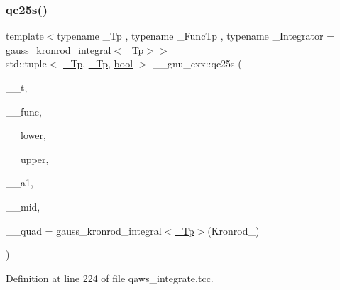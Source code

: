 \subsubsection{\texorpdfstring{qc25s()}{qc25s()}}
{\footnotesize\ttfamily template$<$typename \+\_\+\+Tp , typename \+\_\+\+Func\+Tp , typename \+\_\+\+Integrator  = gauss\+\_\+kronrod\+\_\+integral$<$\+\_\+\+Tp$>$$>$ \\
std\+::tuple$<$ \hyperlink{namespace____gnu__cxx_a3b19a9c800ca194374ef9172290f7d79}{\+\_\+\+Tp}, \hyperlink{namespace____gnu__cxx_a3b19a9c800ca194374ef9172290f7d79}{\+\_\+\+Tp}, \hyperlink{namespace____gnu__cxx_ae83aca57f97767d5d09188718728a0ac}{bool} $>$ \+\_\+\+\_\+gnu\+\_\+cxx\+::qc25s (\begin{DoxyParamCaption}\item[{\hyperlink{struct____gnu__cxx_1_1qaws__integration__table}{qaws\+\_\+integration\+\_\+table}$<$ \hyperlink{namespace____gnu__cxx_a3b19a9c800ca194374ef9172290f7d79}{\+\_\+\+Tp} $>$ \&}]{\+\_\+\+\_\+t,  }\item[{\+\_\+\+Func\+Tp}]{\+\_\+\+\_\+func,  }\item[{\hyperlink{namespace____gnu__cxx_a3b19a9c800ca194374ef9172290f7d79}{\+\_\+\+Tp}}]{\+\_\+\+\_\+lower,  }\item[{\hyperlink{namespace____gnu__cxx_a3b19a9c800ca194374ef9172290f7d79}{\+\_\+\+Tp}}]{\+\_\+\+\_\+upper,  }\item[{\hyperlink{namespace____gnu__cxx_a3b19a9c800ca194374ef9172290f7d79}{\+\_\+\+Tp}}]{\+\_\+\+\_\+a1,  }\item[{\hyperlink{namespace____gnu__cxx_a3b19a9c800ca194374ef9172290f7d79}{\+\_\+\+Tp}}]{\+\_\+\+\_\+mid,  }\item[{\+\_\+\+Integrator}]{\+\_\+\+\_\+quad = {\ttfamily gauss\+\_\+kronrod\+\_\+integral$<$\hyperlink{namespace____gnu__cxx_a3b19a9c800ca194374ef9172290f7d79}{\+\_\+\+Tp}$>$(Kronrod\+\_)} }\end{DoxyParamCaption})}



Definition at line 224 of file qaws\+\_\+integrate.\+tcc.



